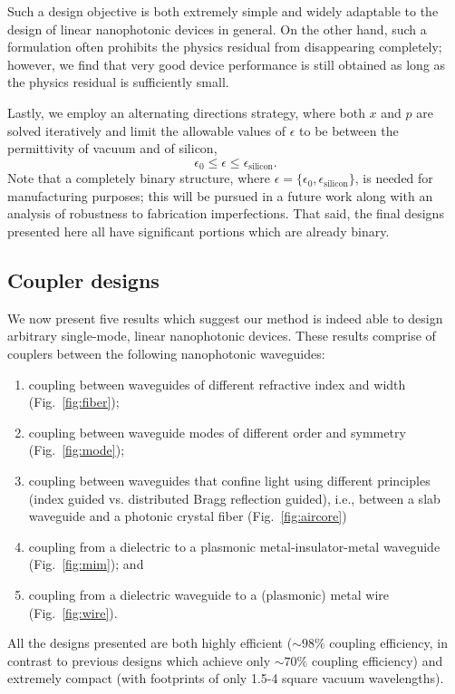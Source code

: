 Such a design objective is both extremely simple and widely adaptable 
    to the design of linear nanophotonic devices in general.
On the other hand, such a formulation often prohibits the physics residual 
    from disappearing completely; 
    however, we find that very good device performance is still obtained
    as long as the physics residual is sufficiently small.

Lastly, we employ an alternating directions strategy,
    where both $x$ and $p$ are solved iteratively\cite{prevwork}
    and limit the allowable values of $\epsilon$ to be between
    the permittivity of vacuum and of silicon,
    \begin{equation}
    \epsilon_0 \le \epsilon \le \epsilon_\text{silicon}.
    \end{equation}
Note that a completely binary structure,
    where $\epsilon = \{\epsilon_0, \epsilon_\text{silicon}\}$,
    is needed for manufacturing purposes; this will be pursued in a future work
    along with an analysis of robustness to fabrication imperfections.
That said, the final designs presented here 
    all have significant portions which are already binary.



\subsection{Coupler designs}
We now present five results which suggest our method
    is indeed able to design arbitrary single-mode, linear nanophotonic devices.
These results comprise of couplers between 
    the following nanophotonic waveguides:
    \begin{enumerate}
    \item coupling between waveguides of different refractive index and width
        (Fig.~\ref{fig:fiber});
    \item coupling between waveguide modes of different order and symmetry
        (Fig.~\ref{fig:mode});
    \item coupling between waveguides that confine light 
        using different principles 
        (index guided vs. distributed Bragg reflection guided), 
        i.e., between a slab waveguide and a photonic crystal fiber
        (Fig.~\ref{fig:aircore})
    \item coupling from a dielectric to a plasmonic metal-insulator-metal 
        waveguide (Fig.~\ref{fig:mim}); and
    \item coupling from a dielectric waveguide to a (plasmonic) metal wire
        (Fig.~\ref{fig:wire}).
    \end{enumerate}
All the designs presented are both highly efficient 
    ($\sim 98\%$ coupling efficiency, in contrast to previous designs
    which achieve only $\sim 70\%$ coupling efficiency\cite{veronis,yang})
    and extremely compact 
    (with footprints of only 1.5-4 square vacuum wavelengths).

